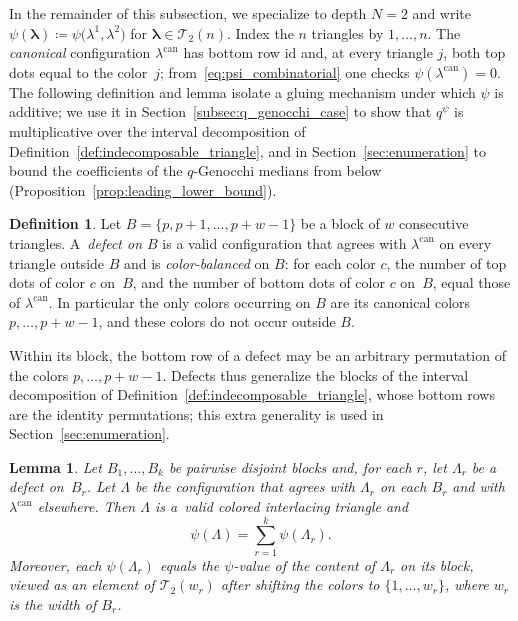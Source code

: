 \documentclass[10pt,a4paper]{amsart}
\numberwithin{equation}{section}
\newtheorem{Lemma}[Theorem]{Lemma}
\theoremstyle{definition}
\newtheorem{Definition}[Theorem]{Definition}
\begin{document}
In the remainder of this subsection, we specialize to depth $N=2$ and
write $\psi(\boldsymbol\lambda)\coloneqq\psi\bigl(\lambda^1,\lambda^2\bigr)$ for
$\boldsymbol\lambda\in\mathcal{T}_2(n)$.
Index the $n$ triangles by $1,\dots,n$.
The \emph{canonical} configuration $\lambda^{\mathrm{can}}$ has bottom row
$\mathrm{id}$ and, at every triangle $j$, both top dots equal to the color~$j$; from~\eqref{eq:psi_combinatorial} one checks
$\psi(\lambda^{\mathrm{can}})=0$.
The following definition and lemma isolate a gluing mechanism under which
$\psi$ is additive; we use it in Section~\ref{subsec:q_genocchi_case} to show
that $q^{\psi}$ is multiplicative over the interval decomposition of
Definition~\ref{def:indecomposable_triangle}, and in Section~\ref{sec:enumeration} to
bound the coefficients of the $q$-Genocchi medians from below
(Proposition~\ref{prop:leading_lower_bound}).

\begin{Definition}
	\label{def:block_defect}
	Let $B=\{p,p+1,\dots,p+w-1\}$ be a block of $w$ consecutive triangles. A~\emph{defect on $B$} is a valid configuration that agrees with
	$\lambda^{\mathrm{can}}$ on every triangle outside $B$ and is
	\emph{color-balanced} on $B$: for each color $c$, the number of top dots
	of color $c$ on~$B$, and the number of bottom dots of color $c$ on~$B$,
	equal those of $\lambda^{\mathrm{can}}$. In particular the only colors
	occurring on $B$ are its canonical colors $p,\dots,p+w-1$, and these colors
	do not occur outside $B$.
\end{Definition}

Within its block, the bottom row of a defect may be an arbitrary permutation of the colors $p,\dots,p+w-1$.  Defects thus generalize the blocks of the interval decomposition of Definition~\ref{def:indecomposable_triangle}, whose bottom rows are the identity permutations; this extra generality is used in Section~\ref{sec:enumeration}.

\begin{Lemma}\label{lem:defect_additivity}
	Let $B_1,\dots,B_k$ be pairwise disjoint blocks and, for each $r$, let
	$\Lambda_r$ be a defect on~$B_r$. Let $\Lambda$ be the configuration that
	agrees with $\Lambda_r$ on each $B_r$ and with $\lambda^{\mathrm{can}}$
	elsewhere. Then $\Lambda$ is a~valid colored interlacing triangle and
	\begin{equation}
		\label{eq:defect_additivity}
		\psi(\Lambda)=\sum_{r=1}^{k}\psi(\Lambda_r).
	\end{equation}
	Moreover, each $\psi(\Lambda_r)$ equals the $\psi$-value of the content
	of $\Lambda_r$ on its block, viewed as an element of
	$\mathcal{T}_2(w_r)$ after shifting the colors to $\{1,\dots,w_r\}$,
	where $w_r$ is the width of $B_r$.
\end{Lemma}
\end{document}

